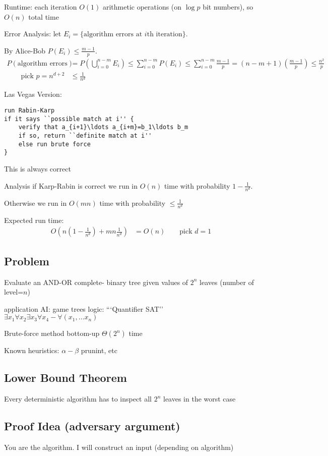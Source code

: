 \documentclass[english,12pt]{article}
\theoremstyle{plain}
\theoremstyle{definition}
\theoremstyle{definition} %
\begin{document}
Runtime: each iteration $O(1)$ arithmetic operations (on $\log p$ bit numbers), so $O(n)$ total time

Error Analysis: let $E_i = \{\text{algorithm errors at }i\text{th iteration}\}$.

By Alice-Bob $P(E_i)\le \frac{m-1}{p}$.
\begin{align*}
P(\text{algorithm errors}) &= P\left(\bigcup_{i=0}^{n-m} E_i\right)
\le \sum_{i=0}^{n-m}P(E_i)
\le \sum_{i=0}^{n-m}\frac{m-1}{p}
=(n-m+1)\left(\frac{m-1}{p}\right)
\le \frac{n^2}{p}\\ \qquad \text{pick }p=n^{d+2}
&\le \frac{1}{n^d} 
\end{align*}

Las Vegas Version:
\begin{verbatim}
run Rabin-Karp
if it says ``possible match at i'' {
    verify that a_{i+1}\ldots a_{i+m}=b_1\ldots b_m
    if so, return ``definite match at i''
    else run brute force
}
\end{verbatim}
This is always correct

Analysis
if Karp-Rabin is correct
we run in $O(n)$ time with probability $1-\frac{1}{n^d}$.

Otherwise we run in $O(mn)$ time with probability $\le \frac{1}{n^d}$

Expected run time:
\begin{align*}
O\left(n\left(1-\frac{1}{n^d}\right)+mn\frac{1}{n^d}\right)&= O(n)\qquad \text{pick }d=1
\end{align*}

\subsection{Problem}
Evaluate an AND-OR complete- binary tree given values of $2^n$ leaves (number of level=$n$)

application 
AI: game trees
logic: ```Quantifier SAT'' $\exists x_1 \forall x_2 \exists x_3\forall x_4-\forall (x_1,\ldots x_n)$

Brute-force method bottom-up $\Theta(2^n)$ time

Known heuristics:
$\alpha-\beta$ prunint, etc

\subsection{Lower Bound Theorem}
Every deterministic algorithm has to inspect all $2^n$ leaves in the worst case

\subsection{Proof Idea (adversary argument)}
You are the algorithm.  I will construct an input (depending on algorithm)
\end{document}
